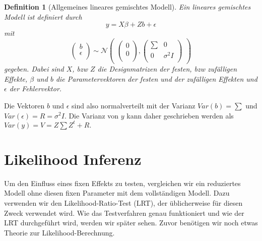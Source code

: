 \documentclass[%
thesis=student,%
coverpage=false,%
titlepage=false,%
headmarks=true, %
german,%
font=libertine, %
math=newpxtx, %
BCOR=5mm,%
coverBCOR=11mm%
]{tumbook}
\theoremstyle{break}
\newtheorem{definition}{Definition}[section]
\begin{document}
\begin{definition}[Allgemeines lineares gemischtes Modell]
	Ein lineares gemischtes Modell ist definiert durch
	$$y = X\beta + Zb + \epsilon $$
	mit $$\begin{pmatrix}
		b \\
		\epsilon \\
	\end{pmatrix}
	\sim
	\mathcal{N}
	\begin{pmatrix}
		\begin{pmatrix}
			
			0 \\
			0 \\
		\end{pmatrix},
		\begin{pmatrix}
			\sum & 0 \\
			0 & \sigma^2I \\
		\end{pmatrix}
	\end{pmatrix}$$
	gegeben. Dabei sind $X$, bzw $Z$ die Designmatrizen der festen, bzw zufälligen Effekte, $\beta$ und $b$ die Parametervektoren der festen und der zufälligen Effekten und $\epsilon$ der Fehlervektor.
\end{definition}\noindent
Die Vektoren $b$ und $\epsilon$ sind also normalverteilt mit der Varianz $Var(b) = \sum$ und $Var(\epsilon) = R = \sigma^2I$. Die Varianz von $y$ kann daher geschrieben werden als $Var(y) = V = Z \sum Z^t + R.$
\section{Likelihood Inferenz}
Um den Einfluss eines fixen Effekts zu testen, vergleichen wir ein reduziertes Modell ohne diesen fixen Parameter mit dem vollständigen Modell. Dazu verwenden wir den Likelihood-Ratio-Test (LRT), der üblicherweise für diesen Zweck verwendet wird. Wie das Testverfahren genau funktioniert und wie der LRT durchgeführt wird, werden wir später sehen. Zuvor benötigen wir noch etwas Theorie zur Likelihood-Berechnung. 
\end{document}
